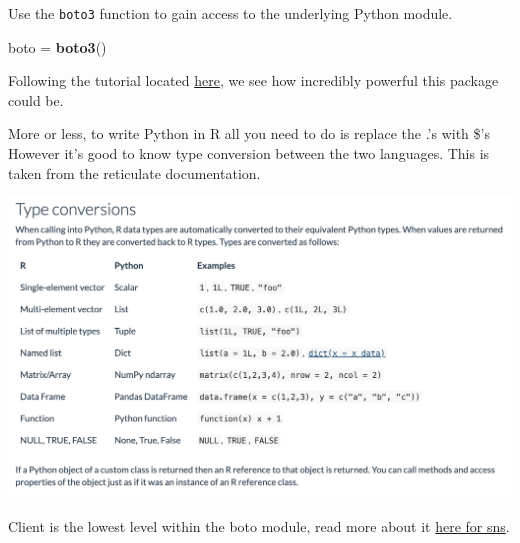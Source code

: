 \documentclass[]{book}
\newenvironment{Shaded}{\begin{snugshade}}{\end{snugshade}}
\newcommand{\DataTypeTok}[1]{\textcolor[rgb]{0.13,0.29,0.53}{#1}}
\newcommand{\KeywordTok}[1]{\textcolor[rgb]{0.13,0.29,0.53}{\textbf{#1}}}
\newcommand{\NormalTok}[1]{#1}
\newcommand{\OperatorTok}[1]{\textcolor[rgb]{0.81,0.36,0.00}{\textbf{#1}}}
\newcommand{\StringTok}[1]{\textcolor[rgb]{0.31,0.60,0.02}{#1}}
\begin{document}
Use the \texttt{boto3} function to gain access to the underlying Python module.

\begin{Shaded}
\begin{Highlighting}[]
\NormalTok{boto =}\StringTok{ }\KeywordTok{boto3}\NormalTok{()}
\end{Highlighting}
\end{Shaded}

Following the tutorial located \href{https://bradmontgomery.net/blog/sending-sms-messages-amazon-sns-and-python/}{here}, we see how incredibly powerful this package could be.

More or less, to write Python in R all you need to do is replace the .'s with \$'s However it's good to know type conversion between the two languages. This is taken from the reticulate documentation.

\includegraphics{_bookdown_files/reticulateconversions.png}

Client is the lowest level within the boto module, read more about it \href{https://boto3.amazonaws.com/v1/documentation/api/latest/reference/services/sns.html\#client}{here for sns}.

\begin{Shaded}
\end{Shaded}

\begin{Shaded}
\end{Shaded}
\end{document}
